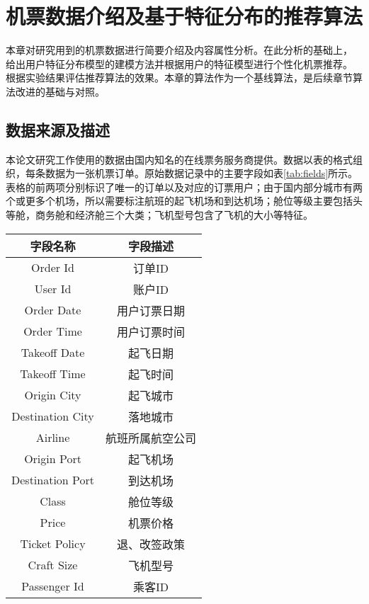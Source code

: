 
\chapter{机票数据介绍及基于特征分布的推荐算法}
\label{chap:baseline}
本章对研究用到的机票数据进行简要介绍及内容属性分析。在此分析的基础上，
给出用户特征分布模型的建模方法并根据用户的特征模型进行个性化机票推荐。
根据实验结果评估推荐算法的效果。本章的算法作为一个基线算法，是后续章节算法改进的基础与对照。

\section{数据来源及描述}
本论文研究工作使用的数据由国内知名的在线票务服务商提供。数据以表的格式组织，每条数据为一张机票订单。原始数据记录中的主要字段如表\ref{tab:fields}所示。
表格的前两项分别标识了唯一的订单以及对应的订票用户；由于国内部分城市有两个或更多个机场，所以需要标注航班的起飞机场和到达机场；舱位等级主要包括头等舱，商务舱和经济舱三个大类；飞机型号包含了飞机的大小等特征。

\begin{table}[!hpb]
  \centering
  \begin{tabular}{|c|c|} \hline 
    字段名称 & 字段描述\\ \hline
    Order Id & 订单ID \\ \hline
    User Id &  账户ID \\ \hline
    Order Date & 用户订票日期 \\ \hline
    Order Time & 用户订票时间 \\ \hline
    Takeoff Date & 起飞日期 \\ \hline
    Takeoff Time & 起飞时间 \\ \hline
    Origin City & 起飞城市 \\ \hline
    Destination City & 落地城市 \\ \hline
    Airline & 航班所属航空公司 \\ \hline
    Origin Port & 起飞机场 \\ \hline
    Destination Port & 到达机场 \\ \hline
    Class & 舱位等级 \\ \hline
    Price & 机票价格 \\ \hline
    Ticket Policy & 退、改签政策 \\ \hline
    Craft Size & 飞机型号 \\ \hline
    Passenger Id & 乘客ID \\ \hline
  \end{tabular}
\end{table}

